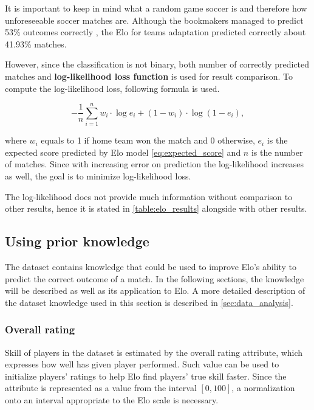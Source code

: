 It is important to keep in mind what a random game soccer is and therefore how unforeseeable soccer matches are. Although the bookmakers managed to predict 53\% outcomes correctly \citep{EuropeanSoccerDatabase}, the Elo for teams adaptation predicted correctly about 41.93\% matches.

However, since the classification is not binary, both number of correctly predicted matches and \textbf{log-likelihood loss function} is used for result comparison. To compute the log-likelihood loss, following formula is used.

\begin{equation*}
\label{eq:log_likelihood}
-\frac{1}{n} \sum_{i=1}^{n} w_i\cdot \log{e_i} + (1-w_i)\cdot \log{(1-e_i)},
\end{equation*}

\noindent where $w_i$ equals to 1 if home team won the match and 0 otherwise, $e_i$ is the expected score predicted by Elo model \eqref{eq:expected_score} and $n$ is the number of matches. Since with increasing error on prediction the log-likelihood increases as well, the goal is to minimize log-likelihood loss.

The log-likelihood does not provide much information without comparison to other results, hence it is stated in \autoref{table:elo_results} alongside with other results.

\subsection{Using prior knowledge}
The dataset contains knowledge that could be used to improve Elo's ability to predict the correct outcome of a match. In the following sections, the knowledge will be described as well as its application to Elo. A more detailed description of the dataset knowledge used in this section is described in \ref{sec:data_analysis}.

\subsubsection{Overall rating}
\label{sec:overall_rating}
Skill of players in the dataset is estimated by the overall rating attribute, which expresses how well has given player performed. Such value can be used to initialize players' ratings to help Elo find players' true skill faster. Since the attribute is represented as a value from the interval $[0, 100]$, a normalization onto an interval appropriate to the Elo scale is necessary.

